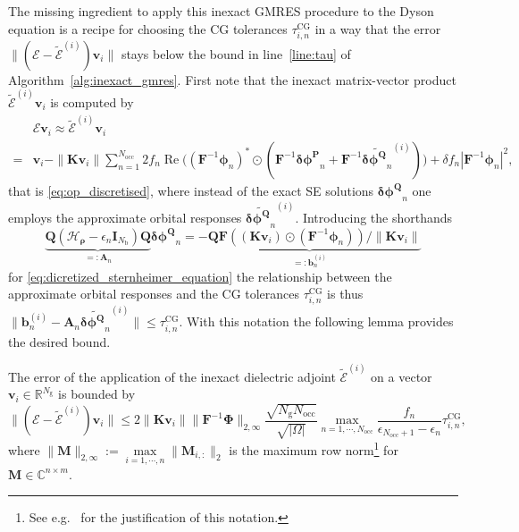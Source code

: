 \documentclass[hidelinks,onefignum,onetabnum]{siamart250211}
\newcommand{\R}{\mathbb{R}}
\newcommand{\C}{\mathbb{C}}
\newcommand{\Real}{\operatorname{Re}}
\newcommand{\Nocc}{N_{\mathrm{occ}}}
\newcommand{\Nb}{N_{\mathrm{b}}}
\newcommand{\Ng}{N_{\mathrm{g}}}
\newcommand{\taucg}{\tau^{\mathrm{CG}}}
\newcommand{\HrhoB}{\bm{\mathcal{H}}_{\bm \rho}}
\begin{document}
%
%
%
%
%
%
%
%
%

The missing ingredient to apply this inexact GMRES procedure
to the Dyson equation is a recipe for choosing the CG tolerances $\taucg_{i,n}$
in a way that the error
%
$\| (\bm{\mathcal E} - \widetilde{\bm{\mathcal E}}^{(i)}) \bm v_i \|$
stays below the bound in line~\ref{line:tau} of Algorithm~\ref{alg:inexact_gmres}.
First note that the inexact matrix-vector product $\widetilde{\bm{\mathcal E}}^{(i)} \bm v_i$
is computed by
\begin{equation}\label{eq:inexact_op_discretised}
  \begin{aligned}
    &\bm{\mathcal E} \bm v_i \approx \bm{\widetilde{\mathcal E}}^{(i)} \bm v_i \\
     = & \bm v_i - \|\bm K \bm v_i\| \sum_{n=1}^{\Nocc} 2 f_n \Real \Big((\bm F^{-1} \bm{\phi}_n)^* \odot ( \bm F^{-1} \bm{\delta \phi^P}_n + \bm F^{-1} \widetilde{\bm{\delta \phi^Q}_n}^{(i)} ) \Big) + \delta f_n \left| \bm F^{-1} \bm{\phi}_n \right|^2,
  \end{aligned}
\end{equation}
that is \eqref{eq:op_discretised}, where instead of the exact SE solutions
$\bm{\delta \phi^Q}_n$ one employs the approximate orbital responses
$\widetilde{\bm{\delta \phi^Q}_n}^{(i)}$.
Introducing the shorthands
\begin{equation}\label{eq:discretised_sternheimer}
  \underbrace{\bm Q \left( \HrhoB - \epsilon_n \bm I_{\Nb} \right) \bm Q}_{=: \bm A_n} \bm{\delta \phi^Q}_n = \underbrace{- \bm Q \bm F\left( (\bm K \bm v_i) \odot \left( \bm F^{-1} \bm{\phi}_n \right) \right)/\|\bm K \bm v_i\|}_{=: \bm b_n^{(i)}}
\end{equation}
for \eqref{eq:dicretized_sternheimer_equation}
the relationship between the approximate orbital responses
and the CG tolerances $\taucg_{i,n}$ is thus
$\|\bm b_n^{(i)} - \bm A_n \widetilde{\bm{\delta \phi^Q}_n}^{(i)}\| \leq \taucg_{i,n}$.
With this notation the following lemma provides the desired bound.
\begin{lemma}\label{lem:cgtol_E}
  The error of the application of the inexact dielectric adjoint $\widetilde{\bm{\mathcal E}}^{(i)}$ on a vector $\bm v_i \in \R^{\Ng}$ is bounded by
  \begin{equation}
      \| (\bm{\mathcal E} - \widetilde{\bm{\mathcal E}}^{(i)}) \bm v_i \| 
      \leq 2 \left\| \bm K \bm v_i\right\| \|\bm{F}^{-1}\bm{\Phi}\|_{2,\infty}  \dfrac{\sqrt{\Ng\Nocc}}{\sqrt{|\Omega|}} \max_{n=1,\cdots,\Nocc} \dfrac{f_n}{\epsilon_{\Nocc + 1} - \epsilon_n} \taucg_{i,n},
  \end{equation}
  where $\|\bm M\|_{2,\infty} := \max\limits_{i = 1, \cdots, n} \| \bm M_{i,:} \|_2$ is the maximum row norm\footnote{See e.g.~\cite{lewis2023listpopularinducedmatrix} for the justification of this notation.} for $\bm M \in \C^{n\times m}$.
\end{lemma}
\end{document}
